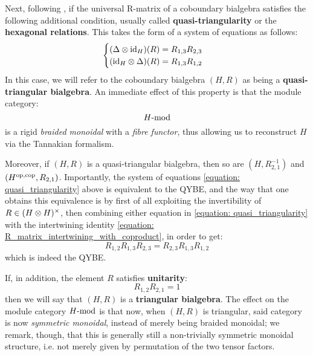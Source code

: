         Next, following \cite[Subsection 9.4.2]{etingof_schiffmann_lectures_on_quantum_groups}, if the universal R-matrix of a coboundary bialgebra satisfies the following additional condition, usually called \textbf{quasi-triangularity} or the \textbf{hexagonal relations}. This takes the form of a system of equations as follows:
            \begin{equation} \label{equation: quasi_triangularity}
                \begin{cases}
                    (\Delta \tensor \id_H)(R) = R_{1, 3} R_{2, 3}
                    \\
                    (\id_H \tensor \Delta)(R) = R_{1, 3} R_{1, 2}
                \end{cases}
            \end{equation}
        In this case, we will refer to the coboundary bialgebra $(H, R)$ as being a \textbf{quasi-triangular bialgebra}. An immediate effect of this property is that the module category:
            $$H\mod$$
        is a rigid \textit{braided monoidal} with a \textit{fibre functor}, thus allowing us to reconstruct $H$ via the Tannakian formalism.
            
        Moreover, if $(H, R)$ is a quasi-triangular bialgebra, then so are $(H, R_{2, 1}^{-1})$ and $(H^{\op, \cop}, R_{2, 1})$. Importantly, the system of equations \eqref{equation: quasi_triangularity} above is equivalent to the QYBE, and the way that one obtains this equivalence is by first of all exploiting the invertibility of $R \in (H \tensor H)^{\x}$, then combining either equation in \eqref{equation: quasi_triangularity} with the intertwining identity \eqref{equation: R_matrix_intertwining_with_coproduct}, in order to get:
            $$R_{1, 2} R_{1, 3} R_{2, 3} = R_{2, 3} R_{1, 3} R_{1, 2}$$
        which is indeed the QYBE.

        If, in addition, the element $R$ satisfies \textbf{unitarity}:
            \begin{equation} \label{equation: unitarity_of_R_matrix}
                R_{1, 2} R_{2, 1} = 1
            \end{equation}
        then we will say that $(H, R)$ is a \textbf{triangular bialgebra}. The effect on the module category $H\mod$ is that now, when $(H, R)$ is triangular, said category is now \textit{symmetric monoidal}, instead of merely being braided monoidal; we remark, though, that this is generally still a non-trivially symmetric monoidal structure, i.e. not merely given by permutation of the two tensor factors.
        
